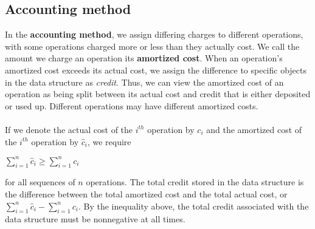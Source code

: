 \documentclass[a4paper]{article}
\begin{document}
\subsection{Accounting method}
In the \textbf{accounting method}, we assign differing charges to different operations, with some operations charged more or less than they actually cost. We call the amount we charge an operation its \textbf{amortized cost}. When an operation's amortized cost exceeds its actual cost, we assign the difference to specific objects in the data structure as \textit{credit}. Thus, we can view the amortized cost of an operation as being split between its actual cost and credit that is either deposited or used up. Different operations may have different amortized costs.\\\\
If we denote the actual cost of the $i^{th}$ operation by $c_i$ and the amortized cost of the $i^{th}$ operation by $\hat{c}_i$, we require
\begin{center}
	$\sum\limits_{i=1}^{n}\hat{c}_i \ge \sum\limits_{i=1}^{n}c_i$
\end{center}
for all sequences of $n$ operations. The total credit stored in the data structure is the difference between the total amortized cost and the total actual cost, or $\sum_{i=1}^{n}\hat{c}_i - \sum_{i=1}^{n}c_i$. By the inequality above, the total credit associated with the data structure must be nonnegative at all times.
\end{document}
